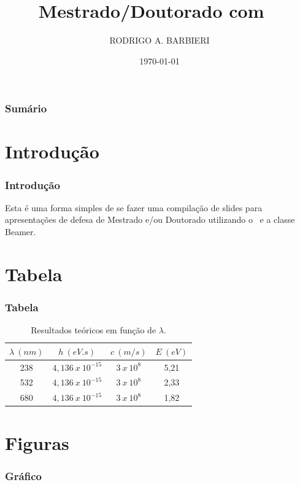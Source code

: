 \documentclass{beamer}
\title[Tese de Mestrado/Doutorado]{Mestrado/Doutorado com \LaTeXe\ }
\author[Barbieri, R. A.]{RODRIGO A. BARBIERI}
\institute[UCS]{Universidade de Caxias do Sul - Brasil}
\date{\today}
\begin{document}
\begin{frame}
 \maketitle
\end{frame}

\begin{frame}
\frametitle{Sumário}
 \tableofcontents
\end{frame}

\section{Introdução}
\begin{frame}
\frametitle{Introdução}
\begin{minipage}{\textwidth}
Esta é uma forma simples de se fazer uma compilação de slides para apresentações de
defesa de Mestrado e/ou Doutorado utilizando o \LaTeXe\ e a classe Beamer.
\end{minipage}
\end{frame} 

\section{Tabela}
\begin{frame}
 \frametitle{Tabela}
\begin{minipage}{\textwidth}
\begin{table}[ht]
  \caption{Resultados teóricos em função de $\lambda$.}
  \begin{tabular}{c|c|c|c}
  \hline\hline 
  $\lambda~(nm)$&$h~(eV.s)$&$c~(m/s)$&$E~(eV)$ \\
  \hline 
  238&$4,136~x~10^{-15}$&$3~x~10^{8}$&5,21 \\
  532&$4,136~x~10^{-15}$&$3~x~10^{8}$&2,33 \\
  680&$4,136~x~10^{-15}$&$3~x~10^{8}$&1,82 \\
  \hline\hline
 \end{tabular}
\end{table}

\end{minipage}
\end{frame}

\section{Figuras}
\begin{frame}
 \frametitle{Gráfico}
\begin{center} 
\end{center}
\end{frame}
\end{document}
